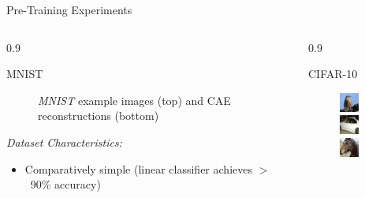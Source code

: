 \documentclass[final]{beamer}
\newlength{\onecolwid}
\newlength{\threecolwid}
\begin{document}
\begin{frame}[t]
\begin{columns}[t]
\begin{column}{\threecolwid}
\begin{alertblock}{Pre-Training Experiments}
\begin{columns}[t, totalwidth=0.9\threecolwid]
\begin{column}{0.9\onecolwid}
\begin{block}{MNIST}
\begin{figure}
	\caption{\emph{MNIST} example images (top) and CAE reconstructions (bottom)}

	\end{figure}

	\emph{Dataset Characteristics:}

	\begin{itemize}
		\item Comparatively simple (linear classifier achieves $>$~90\% accuracy)
	\end{itemize}

	\end{block}
	\end{column}

	\begin{column}{0.9\onecolwid}
	\begin{block}{CIFAR-10}
	\begin{figure}
	\centering
	\includegraphics[width=0.2\linewidth]{graphics/reconstructions/cifar/input_00.png}
	\includegraphics[width=0.2\linewidth]{graphics/reconstructions/cifar/input_01.png}
	\includegraphics[width=0.2\linewidth]{graphics/reconstructions/cifar/input_02.png}


\end{figure}
\end{block}
\end{column}
\end{columns}
\end{alertblock}
\end{column}
\end{columns}
\end{frame}
\end{document}

